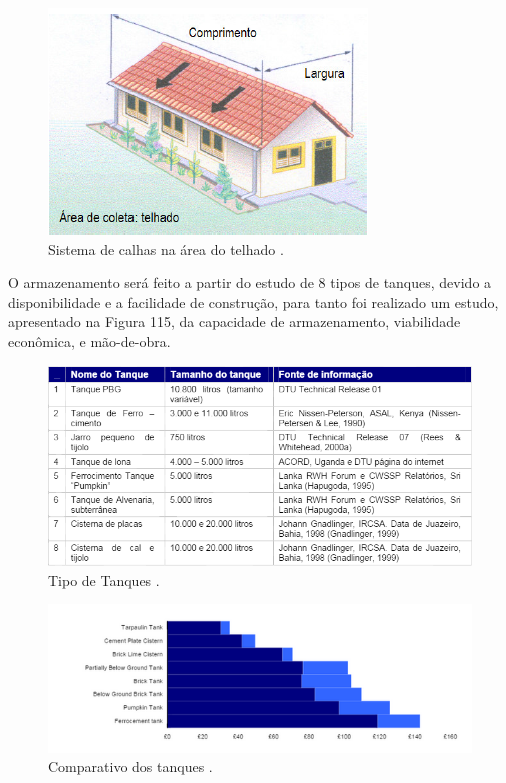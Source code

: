 \begin{figure}[H]
	 \centering
	\label{Sistema de calhas na área do telhado.}
	 \includegraphics[scale=0.6]{captacao/6.png}
	 \caption{Sistema de calhas na área do telhado \cite{WATERFALL}.}
\end{figure}

O armazenamento será feito a partir do estudo de 8 tipos de tanques, devido a disponibilidade e a facilidade de construção, para tanto foi realizado um estudo, apresentado na Figura 115, da capacidade de armazenamento, viabilidade econômica, e mão-de-obra.

\begin{figure}[H]
	 \centering
	\label{Tipo de Tanques}
	 \includegraphics[scale=0.6]{captacao/7.png}
	 \caption{Tipo de Tanques \cite{gnadlinger1999technical}.}
\end{figure}

\begin{figure}[H]
	 \centering
	\label{Comparativo dos tanques}
	 \includegraphics[scale=0.6]{captacao/8.png}
	 \caption{Comparativo dos tanques \cite{gnadlinger1999technical}.}
\end{figure}

